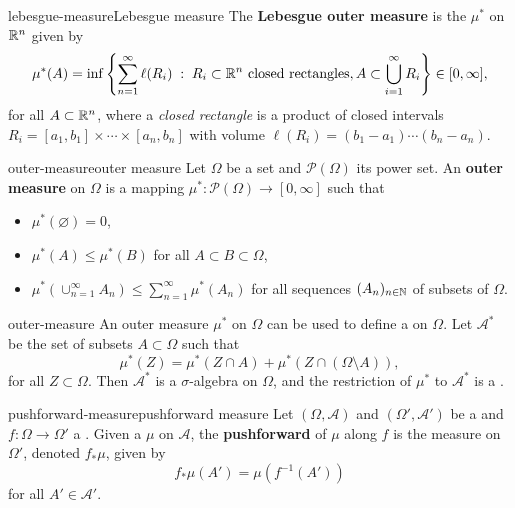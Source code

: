 \begin{topic}{lebesgue-measure}{Lebesgue measure}
    The \textbf{Lebesgue outer measure} is the  $\mu^*$ on $\mathbb{R}^n$ given by
    \[ \mu^*(A) = \inf \left\{ \sum_{n = 1}^{\infty} \ell(R_i) \;:\; R_i \subset \mathbb{R}^n \textup{ closed rectangles}, A \subset \bigcup_{i = 1}^{\infty} R_i \right\} \in [0, \infty] , \]
    for all $A \subset \mathbb{R}^n$, where a \textit{closed rectangle} is a product of closed intervals $R_i = [a_1, b_1] \times \cdots \times [a_n, b_n]$ with volume $\ell(R_i) =  (b_1 - a_1) \cdots (b_n - a_n)$.
\end{topic}

\begin{topic}{outer-measure}{outer measure}
    Let $\Omega$ be a set and $\mathcal{P}(\Omega)$ its power set. An \textbf{outer measure} on $\Omega$ is a mapping $\mu^* \colon \mathcal{P}(\Omega) \to [0, \infty]$ such that
    \begin{itemize}
        \item $\mu^*(\varnothing) = 0$,
        \item $\mu^*(A) \le \mu^*(B)$ for all $A \subset B \subset \Omega$,
        \item $\mu^*\left(\cup_{n = 1}^{\infty} A_n \right) \le \sum_{n = 1}^{\infty} \mu^*(A_n)$ for all sequences $(A_n)_{n \in \mathbb{N}}$ of subsets of $\Omega$.
    \end{itemize}
\end{topic}

\begin{example}{outer-measure}
    An outer measure $\mu^*$ on $\Omega$ can be used to define a  on $\Omega$. Let $\mathcal{A}^*$ be the set of subsets $A \subset \Omega$ such that
    \[ \mu^*(Z) = \mu^*(Z \cap A) + \mu^*(Z \cap (\Omega \setminus A)) , \]
    for all $Z \subset \Omega$. Then $\mathcal{A}^*$ is a $\sigma$-algebra on $\Omega$, and the restriction of $\mu^*$ to $\mathcal{A}^*$ is a .
\end{example}

\begin{topic}{pushforward-measure}{pushforward measure}
    Let $(\Omega, \mathcal{A})$ and $(\Omega', \mathcal{A}')$ be a  and $f \colon \Omega \to \Omega'$ a . Given a  $\mu$ on $\mathcal{A}$, the \textbf{pushforward} of $\mu$ along $f$ is the measure on $\Omega'$, denoted $f_* \mu$, given by
    \[ f_* \mu (A') = \mu(f^{-1}(A')) \]
    for all $A' \in \mathcal{A}'$.
\end{topic}
